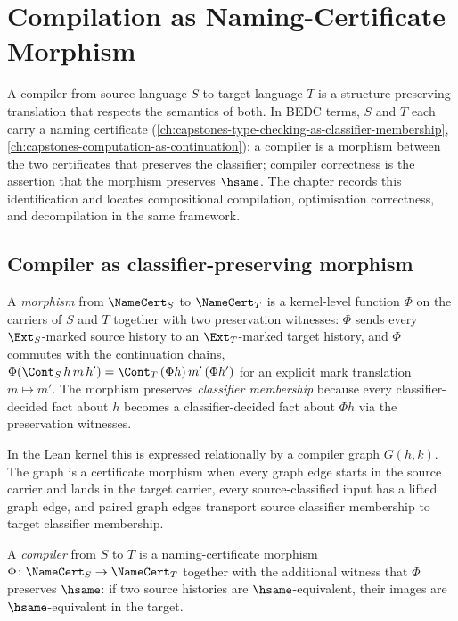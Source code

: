 \chapter{Compilation as Naming-Certificate Morphism}
\label{ch:capstones-compilation-as-namecert-morphism}

A compiler from source language $S$ to target language $T$ is a structure-preserving translation that respects the semantics of both. In BEDC terms, $S$ and $T$ each carry a naming certificate (\autoref{ch:capstones-type-checking-as-classifier-membership}, \autoref{ch:capstones-computation-as-continuation}); a compiler is a morphism between the two certificates that preserves the classifier; compiler correctness is the assertion that the morphism preserves $\hsame$. The chapter records this identification and locates compositional compilation, optimisation correctness, and decompilation in the same framework.

\section{Compiler as classifier-preserving morphism}
\label{sec:compilation-as-namecert-morphism-compiler}

\begin{definition}
\label{def:compilation-namecert-morphism}
A \emph{morphism} from $\NameCert_S$ to $\NameCert_T$ is a kernel-level function $\Phi$ on the carriers of $S$ and $T$ together with two preservation witnesses: $\Phi$ sends every $\Ext_S$-marked source history to an $\Ext_T$-marked target history, and $\Phi$ commutes with the continuation chains, $\Phi(\Cont_S\,h\,m\,h') = \Cont_T\,(\Phi h)\,m'\,(\Phi h')$ for an explicit mark translation $m \mapsto m'$. The morphism preserves \emph{classifier membership} because every classifier-decided fact about $h$ becomes a classifier-decided fact about $\Phi h$ via the preservation witnesses.

In the Lean kernel this is expressed relationally by a compiler graph $G(h,k)$. The graph is a certificate morphism when every graph edge starts in the source carrier and lands in the target carrier, every source-classified input has a lifted graph edge, and paired graph edges transport source classifier membership to target classifier membership.
\end{definition}

\begin{definition}[Compiler]
\label{def:compilation-compiler}
A \emph{compiler} from $S$ to $T$ is a naming-certificate morphism $\Phi \colon \NameCert_S \to \NameCert_T$ together with the additional witness that $\Phi$ preserves $\hsame$: if two source histories are $\hsame$-equivalent, their images are $\hsame$-equivalent in the target.
\end{definition}

